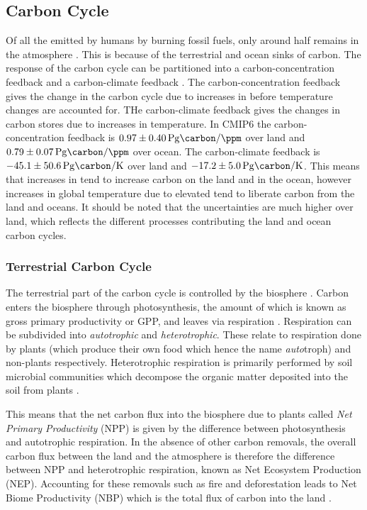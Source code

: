\subsection{Carbon Cycle}
Of all the  emitted by humans by burning fossil fuels, only around half remains in the atmosphere \parencite{Friedlingstein2022}. This is because of the terrestrial and ocean sinks of carbon.
The response of the carbon cycle can be partitioned into a carbon-concentration feedback and a carbon-climate feedback \parencite{Friedlingstein2006}. The carbon-concentration feedback
gives the change in the carbon cycle due to increases in  before temperature changes are accounted for. THe carbon-climate feedback gives the changes in carbon stores due to increases
in temperature. In CMIP6 \parencite{Arora2020} the carbon-concentration feedback is $\SI{0.97\pm0.40}{\peta\gram\carbon\per\ppm}$ over land and $\SI{0.79\pm 0.07}{\peta\gram\carbon\per\ppm}$ over ocean.
The carbon-climate feedback is $\SI{-45.1\pm50.6}{\peta\gram\carbon\per\kelvin}$ over land and $\SI{-17.2\pm5.0}{\peta\gram\carbon\per\kelvin}$. This means that increases in  tend to
increase carbon on the land and in the ocean, however increases in global temperature due to elevated  tend to liberate carbon from the land and oceans. It should be noted
that the uncertainties are much higher over land, which reflects the different processes contributing the land and ocean carbon cycles.

\subsubsection{Terrestrial Carbon Cycle}
The terrestrial part of the carbon cycle is controlled by the biosphere \parencite{AR6}. Carbon enters the biosphere through photosynthesis, the amount of which is known as gross
primary productivity or GPP, and leaves via respiration \parencite{Jenkinson1991}. Respiration can be subdivided into \emph{autotrophic} and \emph{heterotrophic}.
These relate to respiration done by plants (which produce their own food which hence the name \emph{auto}troph) and non-plants respectively. Heterotrophic respiration
is primarily performed by soil microbial communities which decompose the organic matter deposited into the soil from plants \parencite{Singh1977}.

This means that the net carbon flux into the biosphere due to plants called \emph{Net Primary Productivity} (NPP) is given by the difference between photosynthesis and
autotrophic respiration. In the absence of other carbon removals, the overall carbon flux between the land and the atmosphere is therefore the
difference between NPP and heterotrophic respiration, known as Net Ecosystem Production (NEP). Accounting for these removals such as fire and deforestation leads to
Net Biome Productivity (NBP) which is the total flux of carbon into the land \parencite{Lovett2006,Fernandez-Martinez2023}. 


